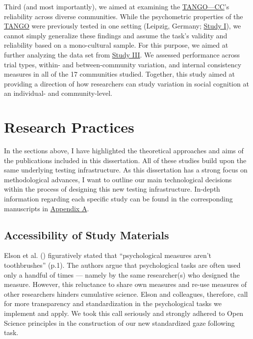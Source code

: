 \documentclass[
]{scrbook}
\begin{document}
Third (and most importantly), we aimed at examining the \hyperref[acronyms_TANGOux2014CC]{TANGO---CC}'s reliability across diverse communities. While the psychometric properties of the \hyperref[acronyms_TANGO]{TANGO} were previously tested in one setting (Leipzig, Germany; \hyperref[studyI]{Study I}), we cannot simply generalize these findings and assume the task's validity and reliability based on a mono-cultural sample. For this purpose, we aimed at further analyzing the data set from \hyperref[studyIII]{Study III}. We assessed performance across trial types, within- and between-community variation, and internal consistency measures in all of the 17 communities studied. Together, this study aimed at providing a direction of how researchers can study variation in social cognition at an individual- and community-level.

\section{Research Practices}\label{researchpractices}

In the sections above, I have highlighted the theoretical approaches and aims of the publications included in this dissertation. All of these studies build upon the same underlying testing infrastructure. As this dissertation has a strong focus on methodological advances, I want to outline our main technological decisions within the process of designing this new testing infrastructure. In-depth information regarding each specific study can be found in the corresponding manuscripts in \hyperref[appendixA]{Appendix A}.

\subsection{Accessibility of Study Materials}\label{accesibility}

Elson et al. () figuratively stated that ``psychological measures aren't toothbrushes'' (p.1). The authors argue that psychological tasks are often used only a handful of times --- namely by the same researcher(s) who designed the measure. However, this reluctance to share own measures and re-use measures of other researchers hinders cumulative science. Elson and colleagues, therefore, call for more transparency and standardization in the psychological tasks we implement and apply. We took this call seriously and strongly adhered to Open Science principles in the construction of our new standardized gaze following task.
\end{document}
